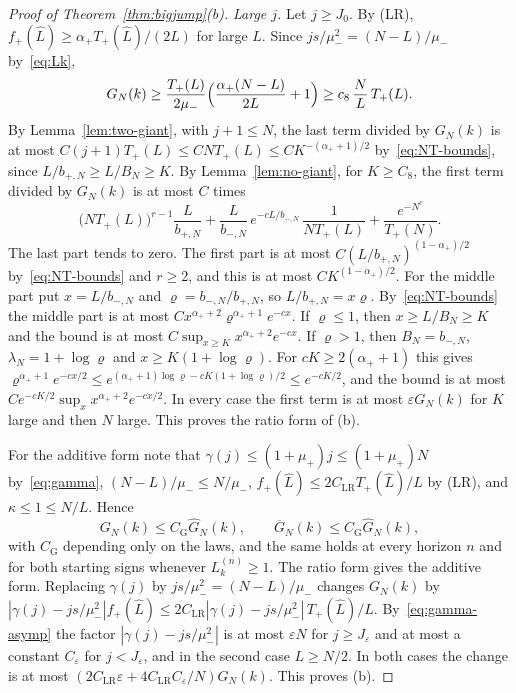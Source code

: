 \begin{proof}[Proof of Theorem~\ref{thm:bigjump}(b)]
\emph{Large $j$.} Let $j\ge J_0$. By (LR), $f_\plus(\hat L)\ge\alpha_\plus T_\plus(\hat L)/(2L)$
for large $L$. Since $js/\mu_\minus^2=(N-L)/\mu_\minus$ by~\eqref{eq:Lk},
\[
 G_N(k)\ge\frac{T_{+}(L)}{2\mu_{-}}\Bigl(\frac{\alpha_{+}(N-L)}{2L}+1\Bigr)\ge c_8\,\frac{N}{L}\,T_{+}(L).
\]
By Lemma~\ref{lem:two-giant}, with $j+1\le N$, the last term divided by $G_N(k)$ is
at most $C(j+1)T_\plus(L)\le CNT_\plus(L)\le CK^{-(\alpha_\plus+1)/2}$
by~\eqref{eq:NT-bounds}, since $L/b_{\plus,N}\ge L/B_N\ge K$. By
Lemma~\ref{lem:no-giant}, for $K\ge C_8$, the first term divided by $G_N(k)$ is at
most $C$ times
\[
 \bigl(NT_\plus(L)\bigr)^{r-1}\frac{L}{b_{\plus,N}}
 +\frac{L}{b_{\minus,N}}\,e^{-cL/b_{\minus,N}}\,\frac1{NT_\plus(L)}
 +\frac{e^{-N^c}}{T_\plus(N)} .
\]
The last part tends to zero. The first part is at most
$C(L/b_{\plus,N})^{(1-\alpha_\plus)/2}$ by~\eqref{eq:NT-bounds} and $r\ge2$, and this
is at most $CK^{(1-\alpha_\plus)/2}$. For the middle
part put $x=L/b_{\minus,N}$ and $\varrho=b_{\minus,N}/b_{\plus,N}$, so
$L/b_{\plus,N}=x\varrho$. By~\eqref{eq:NT-bounds} the middle part is at most
$Cx^{\alpha_\plus+2}\varrho^{\alpha_\plus+1}e^{-cx}$. If $\varrho\le1$, then
$x\ge L/B_N\ge K$ and the bound is at most $C\sup_{x\ge K}x^{\alpha_\plus+2}e^{-cx}$. If
$\varrho>1$, then $B_N=b_{\minus,N}$, $\lambda_N=1+\log\varrho$ and $x\ge K(1+\log\varrho)$.
For $cK\ge2(\alpha_\plus+1)$ this gives
$\varrho^{\alpha_\plus+1}e^{-cx/2}\le e^{(\alpha_\plus+1)\log\varrho-cK(1+\log\varrho)/2}\le e^{-cK/2}$,
and the bound is at most $Ce^{-cK/2}\sup_xx^{\alpha_\plus+2}e^{-cx/2}$. In every case the
first term is at most $\varepsilon G_N(k)$ for $K$ large and then $N$ large. This proves
the ratio form of (b).

For the additive form note that $\gamma(j)\le(1+\mu_\plus)j\le(1+\mu_\plus)N$ by~\eqref{eq:gamma},
$(N-L)/\mu_\minus\le N/\mu_\minus$, $f_\plus(\hat L)\le2C_{\mathrm{LR}}T_\plus(\hat L)/L$ by (LR), and $\kappa\le1\le N/L$. Hence
\begin{equation}\label{eq:G-size}
 G_N(k)\le C_{\mathrm G}\widehat G_N(k),\qquad \overline G_N(k)\le C_{\mathrm G}\widehat G_N(k),
\end{equation}
with $C_{\mathrm G}$ depending only on the laws, and the same holds at every horizon $n$
and for both starting signs whenever $L^{(n)}_k\ge1$. The ratio form gives the additive form. Replacing
$\gamma(j)$ by $js/\mu_\minus^2=(N-L)/\mu_\minus$ changes $G_N(k)$ by
$|\gamma(j)-js/\mu_\minus^2|f_\plus(\hat L)\le2C_{\mathrm{LR}}|\gamma(j)-js/\mu_\minus^2|\,T_\plus(\hat L)/L$.
By~\eqref{eq:gamma-asymp} the factor $|\gamma(j)-js/\mu_\minus^2|$ is at most
$\varepsilon N$ for $j\ge J_\varepsilon$ and at most a constant $C_\varepsilon$ for
$j<J_\varepsilon$, and in the second case $L\ge N/2$. In both cases the change is at
most $(2C_{\mathrm{LR}}\varepsilon+4C_{\mathrm{LR}}C_\varepsilon/N)\widehat G_N(k)$. This proves (b).
\end{proof}

